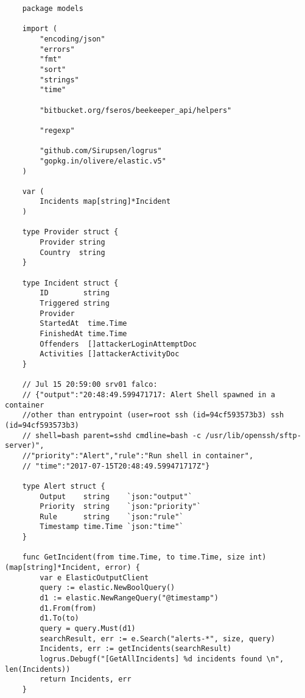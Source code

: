 \begin{verbatim}
    package models

    import (
        "encoding/json"
        "errors"
        "fmt"
        "sort"
        "strings"
        "time"

        "bitbucket.org/fseros/beekeeper_api/helpers"

        "regexp"

        "github.com/Sirupsen/logrus"
        "gopkg.in/olivere/elastic.v5"
    )

    var (
        Incidents map[string]*Incident
    )

    type Provider struct {
        Provider string
        Country  string
    }

    type Incident struct {
        ID        string
        Triggered string
        Provider
        StartedAt  time.Time
        FinishedAt time.Time
        Offenders  []attackerLoginAttemptDoc
        Activities []attackerActivityDoc
    }

    // Jul 15 20:59:00 srv01 falco:
    // {"output":"20:48:49.599471717: Alert Shell spawned in a container
    //other than entrypoint (user=root ssh (id=94cf593573b3) ssh (id=94cf593573b3)
    // shell=bash parent=sshd cmdline=bash -c /usr/lib/openssh/sftp-server)",
    //"priority":"Alert","rule":"Run shell in container",
    // "time":"2017-07-15T20:48:49.599471717Z"}

    type Alert struct {
        Output    string    `json:"output"`
        Priority  string    `json:"priority"`
        Rule      string    `json:"rule"`
        Timestamp time.Time `json:"time"`
    }

    func GetIncident(from time.Time, to time.Time, size int) (map[string]*Incident, error) {
        var e ElasticOutputClient
        query := elastic.NewBoolQuery()
        d1 := elastic.NewRangeQuery("@timestamp")
        d1.From(from)
        d1.To(to)
        query = query.Must(d1)
        searchResult, err := e.Search("alerts-*", size, query)
        Incidents, err := getIncidents(searchResult)
        logrus.Debugf("[GetAllIncidents] %d incidents found \n", len(Incidents))
        return Incidents, err
    }


\end{verbatim}
